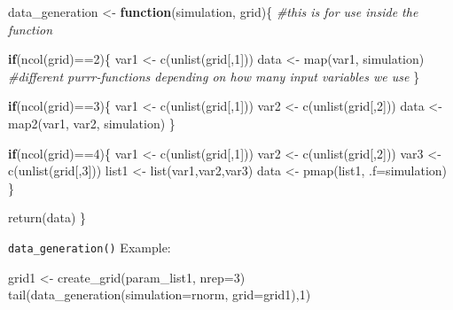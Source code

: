 \documentclass[11pt,a4paper]{article}
\newenvironment{Shaded}{\begin{snugshade}}{\end{snugshade}}
\newcommand{\AttributeTok}[1]{\textcolor[rgb]{0.77,0.63,0.00}{#1}}
\newcommand{\CommentTok}[1]{\textcolor[rgb]{0.56,0.35,0.01}{\textit{#1}}}
\newcommand{\ControlFlowTok}[1]{\textcolor[rgb]{0.13,0.29,0.53}{\textbf{#1}}}
\newcommand{\DecValTok}[1]{\textcolor[rgb]{0.00,0.00,0.81}{#1}}
\newcommand{\FunctionTok}[1]{\textcolor[rgb]{0.00,0.00,0.00}{#1}}
\newcommand{\NormalTok}[1]{#1}
\newcommand{\OtherTok}[1]{\textcolor[rgb]{0.56,0.35,0.01}{#1}}
\newcommand{\SpecialCharTok}[1]{\textcolor[rgb]{0.00,0.00,0.00}{#1}}
\begin{document}
\begin{Shaded}
\begin{Highlighting}[]
\NormalTok{data\_generation }\OtherTok{\textless{}{-}} \ControlFlowTok{function}\NormalTok{(simulation, grid)\{ }
  \CommentTok{\#this is for use inside the function}
  
  \ControlFlowTok{if}\NormalTok{(}\FunctionTok{ncol}\NormalTok{(grid)}\SpecialCharTok{==}\DecValTok{2}\NormalTok{)\{}
\NormalTok{    var1 }\OtherTok{\textless{}{-}} \FunctionTok{c}\NormalTok{(}\FunctionTok{unlist}\NormalTok{(grid[,}\DecValTok{1}\NormalTok{]))}
\NormalTok{    data }\OtherTok{\textless{}{-}} \FunctionTok{map}\NormalTok{(var1, simulation) }
    \CommentTok{\#different purrr{-}functions depending on how many input variables we use}
\NormalTok{  \}}
  
  \ControlFlowTok{if}\NormalTok{(}\FunctionTok{ncol}\NormalTok{(grid)}\SpecialCharTok{==}\DecValTok{3}\NormalTok{)\{}
\NormalTok{    var1 }\OtherTok{\textless{}{-}} \FunctionTok{c}\NormalTok{(}\FunctionTok{unlist}\NormalTok{(grid[,}\DecValTok{1}\NormalTok{]))}
\NormalTok{    var2 }\OtherTok{\textless{}{-}} \FunctionTok{c}\NormalTok{(}\FunctionTok{unlist}\NormalTok{(grid[,}\DecValTok{2}\NormalTok{]))}
\NormalTok{    data }\OtherTok{\textless{}{-}} \FunctionTok{map2}\NormalTok{(var1, var2, simulation)}
\NormalTok{  \} }
  
  \ControlFlowTok{if}\NormalTok{(}\FunctionTok{ncol}\NormalTok{(grid)}\SpecialCharTok{==}\DecValTok{4}\NormalTok{)\{ }
\NormalTok{    var1 }\OtherTok{\textless{}{-}} \FunctionTok{c}\NormalTok{(}\FunctionTok{unlist}\NormalTok{(grid[,}\DecValTok{1}\NormalTok{]))}
\NormalTok{    var2 }\OtherTok{\textless{}{-}} \FunctionTok{c}\NormalTok{(}\FunctionTok{unlist}\NormalTok{(grid[,}\DecValTok{2}\NormalTok{]))}
\NormalTok{    var3 }\OtherTok{\textless{}{-}} \FunctionTok{c}\NormalTok{(}\FunctionTok{unlist}\NormalTok{(grid[,}\DecValTok{3}\NormalTok{]))}
\NormalTok{    list1 }\OtherTok{\textless{}{-}} \FunctionTok{list}\NormalTok{(var1,var2,var3)}
\NormalTok{    data }\OtherTok{\textless{}{-}} \FunctionTok{pmap}\NormalTok{(list1, }\AttributeTok{.f=}\NormalTok{simulation)}
\NormalTok{  \} }
  
  \FunctionTok{return}\NormalTok{(data)}
\NormalTok{\}}
\end{Highlighting}
\end{Shaded}

\texttt{data\_generation()} Example:

\begin{Shaded}
\begin{Highlighting}[]
\NormalTok{grid1 }\OtherTok{\textless{}{-}} \FunctionTok{create\_grid}\NormalTok{(param\_list1, }\AttributeTok{nrep=}\DecValTok{3}\NormalTok{)}
\FunctionTok{tail}\NormalTok{(}\FunctionTok{data\_generation}\NormalTok{(}\AttributeTok{simulation=}\NormalTok{rnorm, }\AttributeTok{grid=}\NormalTok{grid1),}\DecValTok{1}\NormalTok{)}
\end{Highlighting}
\end{Shaded}
\end{document}
